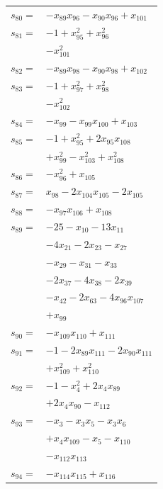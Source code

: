 \begin{longtable}{@{}r@{\;}l@{}}
\(s_{80}=\) & \(\displaystyle -x_{89}x_{96} -x_{90}x_{96} +x_{101}\) \\[3pt]
\(s_{81}=\) & \(\displaystyle -1 +x_{95}^{2} +x_{96}^{2}\) \\
 & \(\displaystyle -x_{101}^{2}\) \\[3pt]
\(s_{82}=\) & \(\displaystyle -x_{89}x_{98} -x_{90}x_{98} +x_{102}\) \\[3pt]
\(s_{83}=\) & \(\displaystyle -1 +x_{97}^{2} +x_{98}^{2}\) \\
 & \(\displaystyle -x_{102}^{2}\) \\[3pt]
\(s_{84}=\) & \(\displaystyle -x_{99} -x_{99}x_{100} +x_{103}\) \\[3pt]
\(s_{85}=\) & \(\displaystyle -1 +x_{95}^{2} +2x_{95}x_{108}\) \\
 & \(\displaystyle +x_{99}^{2} -x_{103}^{2} +x_{108}^{2}\) \\[3pt]
\(s_{86}=\) & \(\displaystyle -x_{96}^{2} +x_{105}\) \\[3pt]
\(s_{87}=\) & \(\displaystyle x_{98} -2x_{104}x_{105} -2x_{105}\) \\[3pt]
\(s_{88}=\) & \(\displaystyle -x_{97}x_{106} +x_{108}\) \\[3pt]
\(s_{89}=\) & \(\displaystyle -25 -x_{10} -13x_{11}\) \\
 & \(\displaystyle -4x_{21} -2x_{23} -x_{27}\) \\
 & \(\displaystyle -x_{29} -x_{31} -x_{33}\) \\
 & \(\displaystyle -2x_{37} -4x_{38} -2x_{39}\) \\
 & \(\displaystyle -x_{42} -2x_{63} -4x_{96}x_{107}\) \\
 & \(\displaystyle +x_{99}\) \\[3pt]
\(s_{90}=\) & \(\displaystyle -x_{109}x_{110} +x_{111}\) \\[3pt]
\(s_{91}=\) & \(\displaystyle -1 -2x_{89}x_{111} -2x_{90}x_{111}\) \\
 & \(\displaystyle +x_{109}^{2} +x_{110}^{2}\) \\[3pt]
\(s_{92}=\) & \(\displaystyle -1 -x_{4}^{2} +2x_{4}x_{89}\) \\
 & \(\displaystyle +2x_{4}x_{90} -x_{112}\) \\[3pt]
\(s_{93}=\) & \(\displaystyle -x_{3} -x_{3}x_{5} -x_{3}x_{6}\) \\
 & \(\displaystyle +x_{4}x_{109} -x_{5} -x_{110}\) \\
 & \(\displaystyle -x_{112}x_{113}\) \\[3pt]
\(s_{94}=\) & \(\displaystyle -x_{114}x_{115} +x_{116}\) \\[3pt]

\end{longtable}
